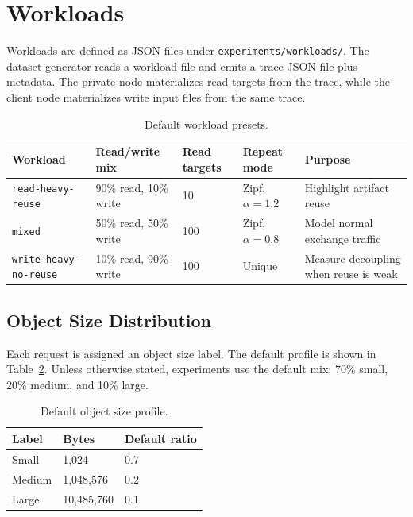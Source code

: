 \documentclass[11pt]{article}
\begin{document}
\section{Workloads}

Workloads are defined as JSON files under \texttt{experiments/workloads/}.
The dataset generator reads a workload file and emits a trace JSON file plus
metadata.  The private node materializes read targets from the trace, while the
client node materializes write input files from the same trace.

\begin{table}[h]
\centering
\caption{Default workload presets.}
\label{tab:workloads}
\begin{tabular}{lllll}
\toprule
\textbf{Workload} & \textbf{Read/write mix} & \textbf{Read targets} &
\textbf{Repeat mode} & \textbf{Purpose} \\
\midrule
\texttt{read-heavy-reuse} &
90\% read, 10\% write &
10 &
Zipf, $\alpha=1.2$ &
Highlight artifact reuse \\
\texttt{mixed} &
50\% read, 50\% write &
100 &
Zipf, $\alpha=0.8$ &
Model normal exchange traffic \\
\texttt{write-heavy-no-reuse} &
10\% read, 90\% write &
100 &
Unique &
Measure decoupling when reuse is weak \\
\bottomrule
\end{tabular}
\end{table}

\subsection{Object Size Distribution}

Each request is assigned an object size label.  The default profile is shown in
Table~\ref{tab:sizes}.  Unless otherwise stated, experiments use the default
mix: 70\% small, 20\% medium, and 10\% large.

\begin{table}[h]
\centering
\caption{Default object size profile.}
\label{tab:sizes}
\begin{tabular}{lll}
\toprule
\textbf{Label} & \textbf{Bytes} & \textbf{Default ratio} \\
\midrule
Small & 1,024 & 0.7 \\
Medium & 1,048,576 & 0.2 \\
Large & 10,485,760 & 0.1 \\
\bottomrule
\end{tabular}
\end{table}
\end{document}
